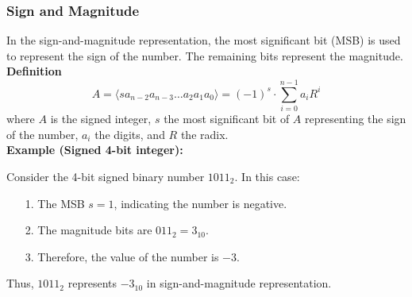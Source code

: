 \subsubsection{Sign and Magnitude}
In the sign-and-magnitude representation, the most significant bit (MSB) is used to represent the sign of the number. The remaining bits represent the magnitude. \\
\vspace*{7px}
\textbf{Definition} \\
\vspace*{3px}
\[
A = \langle s a_{n-2} a_{n-3} \dots a_2 a_1 a_0 \rangle = (-1)^s \cdot \sum_{i=0}^{n-1} a_i R^i
\]
where \(A\) is the signed integer, \(s\) the most significant bit of \(A\) representing the sign of the number, \(a_i\) the digits, and \(R\) the radix. \\
\vspace*{7px}
\textbf{Example (Signed 4-bit integer):} \\
\vspace*{3px}

Consider the 4-bit signed binary number \(1011_2\). In this case: \\
\begin{itemize}
    \item[1.] The MSB \(s = 1\), indicating the number is negative.
    \item[2.] The magnitude bits are \(011_2 = 3_{10}\).
    \item[3.] Therefore, the value of the number is \(-3\).
\end{itemize}

Thus, \(1011_2\) represents \(-3_{10}\) in sign-and-magnitude representation. \\
\vspace*{7px}

